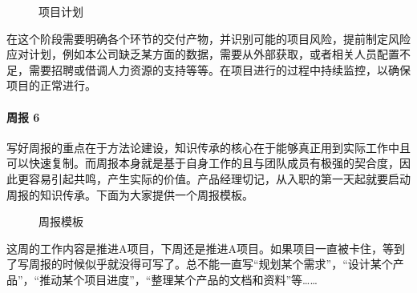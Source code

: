 \documentclass[letterpaper,11pt,english]{sphinxmanual}
\begin{document}
\begin{figure}[H]
\centering
\capstart

\noindent{}
\caption{项目计划}\label{\detokenize{chapter_knowledge/project_manage:id20}}\end{figure}

在这个阶段需要明确各个环节的交付产物，并识别可能的项目风险，提前制定风险应对计划，例如本公司缺乏某方面的数据，需要从外部获取，或者相关人员配置不足，需要招聘或借调人力资源的支持等等。在项目进行的过程中持续监控，以确保项目的正常进行。%
\begin{footnote}[561]\sphinxAtStartFootnote
{}
%
\end{footnote}


\paragraph{周报 6\sphinxfootnotemark[562]}
\label{\detokenize{chapter_knowledge/project_manage:id9}}%
\begin{footnotetext}[562]\sphinxAtStartFootnote
{}
%
\end{footnotetext}\ignorespaces 
写好周报的重点在于方法论建设，知识传承的核心在于能够真正用到实际工作中且可以快速复制。而周报本身就是基于自身工作的且与团队成员有极强的契合度，因此更容易引起共鸣，产生实际的价值。产品经理切记，从入职的第一天起就要启动周报的知识传承。下面为大家提供一个周报模板。

\begin{figure}[H]
\centering
\capstart

\noindent{}
\caption{周报模板}\label{\detokenize{chapter_knowledge/project_manage:id21}}\end{figure}

这周的工作内容是推进A项目，下周还是推进A项目。如果项目一直被卡住，等到了写周报的时候似乎就没得可写了。总不能一直写“规划某个需求”，“设计某个产品”，“推动某个项目进度”，“整理某个产品的文档和资料”等……%
\begin{footnote}[563]\sphinxAtStartFootnote
{}
%
\end{footnote}
\end{document}
